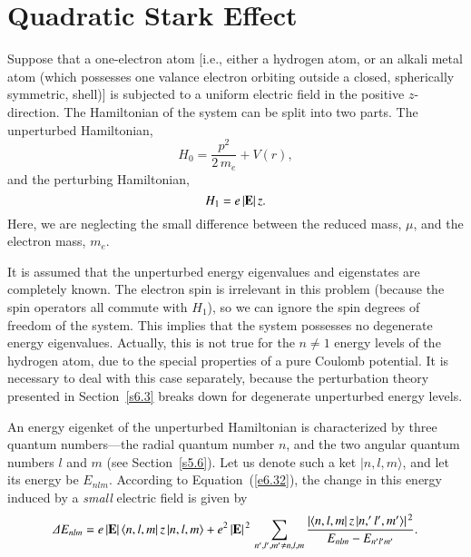 \section{Quadratic Stark Effect}\label{s6.4}
Suppose that a one-electron atom [{\rm i.e.}, either a hydrogen atom, or an alkali metal
atom (which possesses  one valance electron orbiting outside a closed, spherically
symmetric, shell)] is subjected to a uniform electric field in the positive
$z$-direction. The Hamiltonian of the system can be split into two
parts. The unperturbed Hamiltonian,
\begin{equation}
H_0 = \frac{{p}^2}{2\,m_e} + V(r),
\end{equation}
and the perturbing Hamiltonian,
\begin{equation}
H_1=  e\, |{\bf E}|\, z.
\end{equation}
Here, we are neglecting the small difference between the reduced mass, $\mu$, and the electron mass, $m_e$. 

It is assumed that the unperturbed energy eigenvalues and eigenstates are completely
known. The electron spin is irrelevant in this problem (because the spin operators
all commute with $H_1$), so we can ignore the spin degrees of freedom of the system.
This implies that the system possesses no degenerate energy eigenvalues. Actually, this is
not true for the $n\neq 1$ energy levels of the hydrogen atom, due to the special
properties of a pure Coulomb potential. 
It is necessary to deal with this case separately, because
the perturbation theory presented in Section~\ref{s6.3} breaks down  for  degenerate
unperturbed energy levels. 

An  energy eigenket of the unperturbed Hamiltonian is characterized by three quantum numbers---the radial quantum number $n$, and the two angular quantum numbers $l$ and
$m$ (see Section~\ref{s5.6}). Let us denote such a ket $|n,l,m\rangle$, and let its
energy  be $E_{nlm}$. According to Equation~(\ref{e6.32}), the change in this
energy induced by a {\em small}\/ electric field is given by
\begin{equation}
{\mit\Delta} E_{nlm}=e\,|{\bf E}|\, \langle n,l,m |\,z\,|n,l,m\rangle+ e^2 \,|{\bf E}|^{\,2}\,\sum_{n',l',m'\neq n,l,m} \frac{|\langle 
n,l,m|\,z\,| n,'l',m'\rangle|^{\,2}}{ E_{nlm}-E_{n'l'm'} }.\label{e6.38}
\end{equation}

